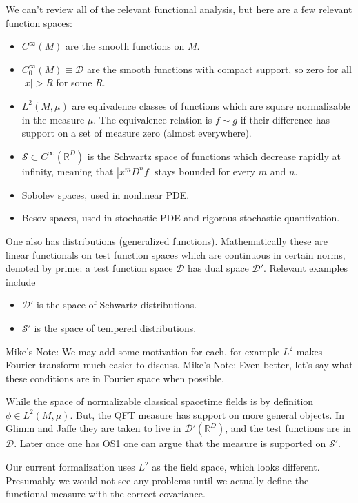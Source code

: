 \documentclass{article}
\newcommand{\1}{\mathbbm{1}}
\theoremstyle{plain}
\theoremstyle{definition}
\numberwithin{equation}{section}
\def\IR{\mathbb{R}}
\newcommand{\cD}{\mathcal D}
\newcommand{\cS}{\mathcal S}
\newcommand\MRD[1]{{\color{red} Mike's Note: #1}}
\begin{document}
We can't review all of the relevant functional analysis, but here are a few relevant function spaces:
\begin{itemize}
    \item $C^\infty(M)$ are the smooth functions on $M$. 
    \item $C_0^\infty(M) \equiv \cD$ are the smooth functions with compact support, so zero for all $|x|>R$ for some $R$.
    \item $L^2(M,\mu)$ are equivalence classes of functions which are square normalizable in the measure $\mu$.   The equivalence relation
    is $f \sim g$ if their difference has support on a set of measure zero (almost everywhere).
    \item $\cS \subset C^\infty(\IR^D)$ is the Schwartz space of functions which decrease rapidly at infinity, meaning that
    $|x^m D^n f|$ stays bounded for every $m$ and $n$.
    \item Sobolev spaces, used in nonlinear PDE.
    \item Besov spaces, used in stochastic PDE and rigorous stochastic quantization.
\end{itemize}
One also has distributions (generalized functions).  Mathematically these are linear functionals
on test function spaces which are continuous in certain norms, denoted by prime: 
a test function space $\cD$ has dual space $\cD'$.  
Relevant examples include 
\begin{itemize}
    \item $\cD'$ is the space of Schwartz distributions.
    \item $\cS'$ is the space of tempered distributions.
\end{itemize}
\MRD{We may add some motivation for each, for example $L^2$ makes Fourier transform much easier to discuss.}
\MRD{Even better, let's say what these conditions are in Fourier space when possible.}

While the space of normalizable classical spacetime fields is by definition $\phi \in L^2(M,\mu)$.  But, the
QFT measure has support on more general objects.  In Glimm and Jaffe they are taken to live in
$\cD'(\IR^D)$, and the test functions are in $\cD$.  Later once one has OS1 one can argue that the measure
is supported on $\cS'$.

Our current formalization uses $L^2$ as the field space, which looks different.  Presumably we would not
see any problems until we actually define the functional measure with the correct covariance.
\end{document}
